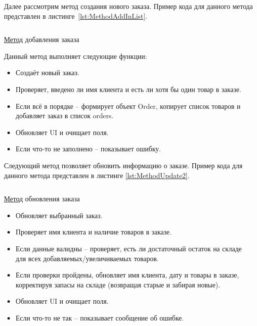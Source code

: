\documentclass[12pt]{article}
\newcommand{\colorGIT}[1]{\textcolor{CtpLavender}{#1}}
\renewcommand{\texttt}[1]{{\small\ttfamily #1}}
\begin{document}
{}

Далее рассмотрим метод создания нового заказа. Пример кода для данного метода
представлен в листинге~\ref{lst:MethodAddInList}.

\begin{listing}[H]
	\inputminted[firstline=186, lastline=216]{csharp}{../../3lab/StoreManager/MainWindow.xaml.cs}
	\caption{\colorGIT{\href{https://github.com/WebMasterIT/Csharp_Labs/blob/ec375afd16c0647b337cf3d8a79c8bef904fc1be/3lab/StoreManager/MainWindow.xaml.cs\#L186-L216}{Метод}} добавления заказа}
	\label{lst:MethodAddInList}
\end{listing}

\noindent Данный метод выполняет следующие функции:
\begin{itemize}
	\item Создаёт новый заказ.
	\item Проверяет, введено ли имя клиента и есть ли хотя бы один товар в заказе.
	\item Если всё в порядке -- формирует объект \texttt{Order}, копирует список товаров и добавляет заказ в список \texttt{orders}.
	\item Обновляет \texttt{UI} и очищает поля.
	\item Если что-то не заполнено -- показывает ошибку.
\end{itemize}

Следующий метод позволяет обновить информацию о заказе. Пример кода для данного метода представлен в листинге \ref{lst:MethodUpdate2}.

\begin{listing}[H]
	\inputminted[firstline=218, lastline=266]{csharp}{../../3lab/StoreManager/MainWindow.xaml.cs}
	\caption{\colorGIT{\href{https://github.com/WebMasterIT/Csharp_Labs/blob/ec375afd16c0647b337cf3d8a79c8bef904fc1be/3lab/StoreManager/MainWindow.xaml.cs\#L218-L266}{Метод}} обновления заказа}
	\label{lst:MethodUpdate2}
\end{listing}

\begin{itemize}
	\item Обновляет выбранный заказ.
	\item Проверяет имя клиента и наличие товаров в заказе.
	\item Если данные валидны -- проверяет, есть ли достаточный остаток на складе для всех добавляемых/увеличиваемых товаров.
	\item Если проверки пройдены, обновляет имя клиента, дату и товары в заказе, корректируя запасы на складе (возвращая старые и забирая новые).
	\item Обновляет \texttt{UI} и очищает поля.
	\item Если что-то не так -- показывает сообщение об ошибке.
\end{itemize}
\end{document}
